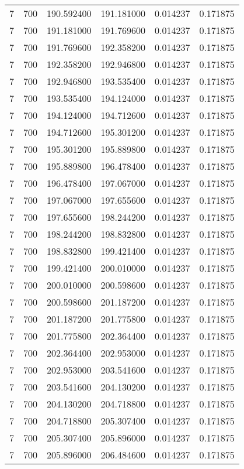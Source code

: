 \begin{longtable}{rrrrrr}
7 & 700 & 190.592400 & 191.181000 & 0.014237 & 0.171875 \\
7 & 700 & 191.181000 & 191.769600 & 0.014237 & 0.171875 \\
7 & 700 & 191.769600 & 192.358200 & 0.014237 & 0.171875 \\
7 & 700 & 192.358200 & 192.946800 & 0.014237 & 0.171875 \\
7 & 700 & 192.946800 & 193.535400 & 0.014237 & 0.171875 \\
7 & 700 & 193.535400 & 194.124000 & 0.014237 & 0.171875 \\
7 & 700 & 194.124000 & 194.712600 & 0.014237 & 0.171875 \\
7 & 700 & 194.712600 & 195.301200 & 0.014237 & 0.171875 \\
7 & 700 & 195.301200 & 195.889800 & 0.014237 & 0.171875 \\
7 & 700 & 195.889800 & 196.478400 & 0.014237 & 0.171875 \\
7 & 700 & 196.478400 & 197.067000 & 0.014237 & 0.171875 \\
7 & 700 & 197.067000 & 197.655600 & 0.014237 & 0.171875 \\
7 & 700 & 197.655600 & 198.244200 & 0.014237 & 0.171875 \\
7 & 700 & 198.244200 & 198.832800 & 0.014237 & 0.171875 \\
7 & 700 & 198.832800 & 199.421400 & 0.014237 & 0.171875 \\
7 & 700 & 199.421400 & 200.010000 & 0.014237 & 0.171875 \\
7 & 700 & 200.010000 & 200.598600 & 0.014237 & 0.171875 \\
7 & 700 & 200.598600 & 201.187200 & 0.014237 & 0.171875 \\
7 & 700 & 201.187200 & 201.775800 & 0.014237 & 0.171875 \\
7 & 700 & 201.775800 & 202.364400 & 0.014237 & 0.171875 \\
7 & 700 & 202.364400 & 202.953000 & 0.014237 & 0.171875 \\
7 & 700 & 202.953000 & 203.541600 & 0.014237 & 0.171875 \\
7 & 700 & 203.541600 & 204.130200 & 0.014237 & 0.171875 \\
7 & 700 & 204.130200 & 204.718800 & 0.014237 & 0.171875 \\
7 & 700 & 204.718800 & 205.307400 & 0.014237 & 0.171875 \\
7 & 700 & 205.307400 & 205.896000 & 0.014237 & 0.171875 \\
7 & 700 & 205.896000 & 206.484600 & 0.014237 & 0.171875 \\

\end{longtable}

